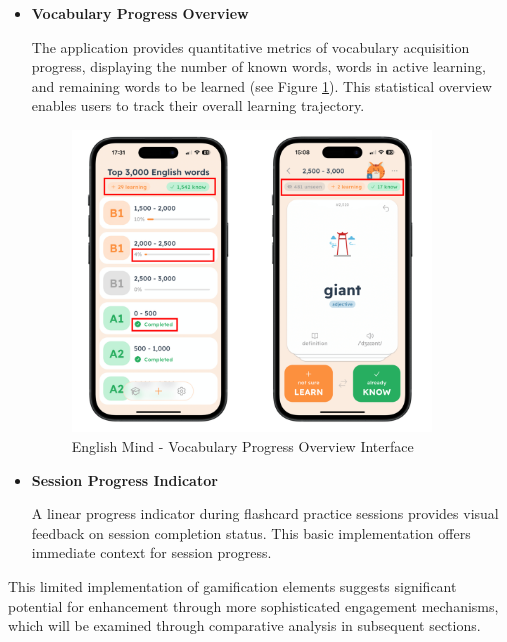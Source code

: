 \begin{itemize}
    \item \textbf{Vocabulary Progress Overview} 
    \label{chap:em-progess-tracking}
    
    The application provides quantitative metrics of vocabulary acquisition progress, displaying the number of known words, words in active learning, and remaining words to be learned (see Figure \ref{fig:em-progress-tracking}). This statistical overview enables users to track their overall learning trajectory.

    \begin{figure}[!h]
        \includegraphics[width=0.9\textwidth]{src/figures/em-progress-tracking.png}
        \caption{English Mind - Vocabulary Progress Overview Interface}
        \label{fig:em-progress-tracking}
    \end{figure}

    \item \textbf{Session Progress Indicator}
    
    A linear progress indicator during flashcard practice sessions provides visual feedback on session completion status. This basic implementation offers immediate context for session progress.
    
\end{itemize}

This limited implementation of gamification elements suggests significant potential for enhancement through more sophisticated engagement mechanisms, which will be examined through comparative analysis in subsequent sections.

